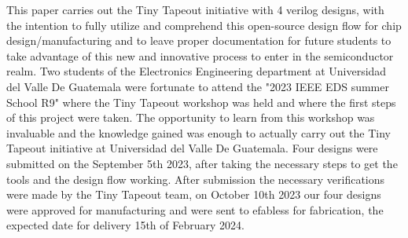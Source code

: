 This paper carries out the Tiny Tapeout initiative with 4 verilog designs,
with the intention to fully utilize and comprehend this open-source design 
flow for chip design/manufacturing and to leave proper documentation for future 
students to take advantage of this new and innovative process to enter in the 
semiconductor realm.
Two students of the Electronics Engineering department at Universidad del Valle De Guatemala were 
fortunate to attend the "2023 IEEE EDS summer School R9" where the Tiny Tapeout workshop was 
held and where the first steps of this project were taken. The opportunity to learn from this 
workshop was invaluable and the knowledge gained was enough to actually carry out the 
Tiny Tapeout initiative at Universidad del Valle De Guatemala. Four designs were submitted 
on the September 5th 2023, after taking the necessary steps to get the tools and the 
design flow working. After submission the necessary verifications were made by the 
Tiny Tapeout team, on October 10th 2023 our four designs were approved for manufacturing 
and were sent to efabless for fabrication, the expected date for delivery 15th of February 2024. 
